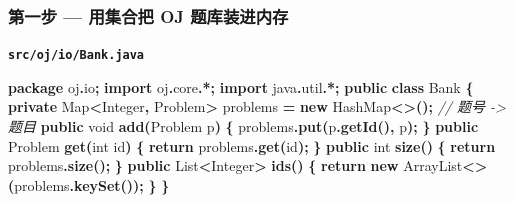 \documentclass[
  11pt,
]{ctexart}
\newenvironment{Shaded}{\begin{snugshade}}{\end{snugshade}}
\newcommand{\BuiltInTok}[1]{#1}
\newcommand{\CommentTok}[1]{\textcolor[rgb]{0.56,0.35,0.01}{\textit{#1}}}
\newcommand{\ControlFlowTok}[1]{\textcolor[rgb]{0.13,0.29,0.53}{\textbf{#1}}}
\newcommand{\DataTypeTok}[1]{\textcolor[rgb]{0.13,0.29,0.53}{#1}}
\newcommand{\FunctionTok}[1]{\textcolor[rgb]{0.13,0.29,0.53}{\textbf{#1}}}
\newcommand{\ImportTok}[1]{#1}
\newcommand{\KeywordTok}[1]{\textcolor[rgb]{0.13,0.29,0.53}{\textbf{#1}}}
\newcommand{\NormalTok}[1]{#1}
\newcommand{\OperatorTok}[1]{\textcolor[rgb]{0.81,0.36,0.00}{\textbf{#1}}}
\begin{document}
\hypertarget{ux7b2cux4e00ux6b65-ux7528ux96c6ux5408ux628a-oj-ux9898ux5e93ux88c5ux8fdbux5185ux5b58}{%
\subsubsection{\texorpdfstring{第一步 \KS --- 用集合把 OJ
题库装进内存}{第一步 --- 用集合把 OJ 题库装进内存}}\label{ux7b2cux4e00ux6b65-ux7528ux96c6ux5408ux628a-oj-ux9898ux5e93ux88c5ux8fdbux5185ux5b58}}

\textbf{\texttt{src/oj/io/Bank.java}}

\begin{Shaded}
\begin{Highlighting}[]
\KeywordTok{package}\ImportTok{ oj}\OperatorTok{.}\ImportTok{io}\OperatorTok{;}
\KeywordTok{import} \ImportTok{oj}\OperatorTok{.}\ImportTok{core}\OperatorTok{.*;}
\KeywordTok{import} \ImportTok{java}\OperatorTok{.}\ImportTok{util}\OperatorTok{.*;}
\KeywordTok{public} \KeywordTok{class}\NormalTok{ Bank }\OperatorTok{\{}
    \KeywordTok{private} \BuiltInTok{Map}\OperatorTok{\textless{}}\BuiltInTok{Integer}\OperatorTok{,}\NormalTok{ Problem}\OperatorTok{\textgreater{}}\NormalTok{ problems }\OperatorTok{=} \KeywordTok{new} \BuiltInTok{HashMap}\OperatorTok{\textless{}\textgreater{}();}   \CommentTok{// 题号 {-}\textgreater{} 题目}
    \KeywordTok{public} \DataTypeTok{void} \FunctionTok{add}\OperatorTok{(}\NormalTok{Problem p}\OperatorTok{)}   \OperatorTok{\{}\NormalTok{ problems}\OperatorTok{.}\FunctionTok{put}\OperatorTok{(}\NormalTok{p}\OperatorTok{.}\FunctionTok{getId}\OperatorTok{(),}\NormalTok{ p}\OperatorTok{);} \OperatorTok{\}}
    \KeywordTok{public}\NormalTok{ Problem }\FunctionTok{get}\OperatorTok{(}\DataTypeTok{int}\NormalTok{ id}\OperatorTok{)}   \OperatorTok{\{} \ControlFlowTok{return}\NormalTok{ problems}\OperatorTok{.}\FunctionTok{get}\OperatorTok{(}\NormalTok{id}\OperatorTok{);} \OperatorTok{\}}
    \KeywordTok{public} \DataTypeTok{int} \FunctionTok{size}\OperatorTok{()}            \OperatorTok{\{} \ControlFlowTok{return}\NormalTok{ problems}\OperatorTok{.}\FunctionTok{size}\OperatorTok{();} \OperatorTok{\}}
    \KeywordTok{public} \BuiltInTok{List}\OperatorTok{\textless{}}\BuiltInTok{Integer}\OperatorTok{\textgreater{}} \FunctionTok{ids}\OperatorTok{()}   \OperatorTok{\{} \ControlFlowTok{return} \KeywordTok{new} \BuiltInTok{ArrayList}\OperatorTok{\textless{}\textgreater{}(}\NormalTok{problems}\OperatorTok{.}\FunctionTok{keySet}\OperatorTok{());} \OperatorTok{\}}
\OperatorTok{\}}
\end{Highlighting}
\end{Shaded}
\end{document}
